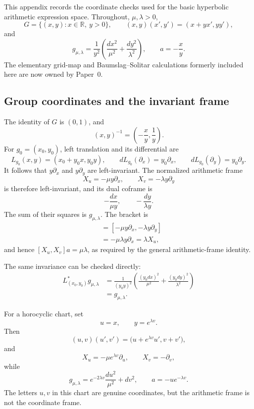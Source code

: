 This appendix records the coordinate checks used for the basic hyperbolic
arithmetic expression space.  Throughout, \(\mu,\lambda>0\),
\[
 G=\{(x,y):x\in\mathbb R,\ y>0\},
 \qquad
 (x,y)(x',y')=(x+yx',yy'),
\]
and
\[
 g_{\mu,\lambda}
 =\frac1{y^2}
  \left(\frac{dx^2}{\mu^2}+\frac{dy^2}{\lambda^2}\right),
 \qquad
 a=-\frac xy.
\]
The elementary grid-map and Baumslag--Solitar calculations formerly included
here are now owned by Paper~0.

\subsection{Group coordinates and the invariant frame}

The identity of \(G\) is \((0,1)\), and
\[
 (x,y)^{-1}=\left(-\frac xy,\frac1y\right).
\]
For \(g_0=(x_0,y_0)\), left translation and its differential are
\[
 L_{g_0}(x,y)=(x_0+y_0x,y_0y),
 \qquad
 dL_{g_0}(\partial_x)=y_0\partial_x,
 \qquad
 dL_{g_0}(\partial_y)=y_0\partial_y.
\]
It follows that \(y\partial_x\) and \(y\partial_y\) are left-invariant.
The normalized arithmetic frame
\[
 X_u=-\mu y\partial_x,
 \qquad
 X_v=-\lambda y\partial_y
\]
is therefore left-invariant, and its dual coframe is
\[
 -\frac{dx}{\mu y},
 \qquad
 -\frac{dy}{\lambda y}.
\]
The sum of their squares is \(g_{\mu,\lambda}\).  The bracket is
\begin{align*}
 [X_u,X_v]
 &=[-\mu y\partial_x,-\lambda y\partial_y]\\
 &=-\mu\lambda y\partial_x
 =\lambda X_u,
\end{align*}
and hence \([X_u,X_v]a=\mu\lambda\), as required by the general
arithmetic-frame identity.

The same invariance can be checked directly:
\begin{align*}
 L_{(x_0,y_0)}^*g_{\mu,\lambda}
 &=
 \frac1{(y_0y)^2}
 \left(
  \frac{(y_0dx)^2}{\mu^2}
  +\frac{(y_0dy)^2}{\lambda^2}
 \right)\\
 &=g_{\mu,\lambda}.
\end{align*}

For a horocyclic chart, set
\[
 u=x,\qquad y=e^{\lambda v}.
\]
Then
\[
 (u,v)(u',v')
 =\bigl(u+e^{\lambda v}u',v+v'\bigr),
\]
and
\[
 X_u=-\mu e^{\lambda v}\partial_u,
 \qquad
 X_v=-\partial_v,
\]
while
\[
 g_{\mu,\lambda}
 =e^{-2\lambda v}\frac{du^2}{\mu^2}+dv^2,
 \qquad
 a=-u e^{-\lambda v}.
\]
The letters \(u,v\) in this chart are genuine coordinates, but the arithmetic
frame is not the coordinate frame.

